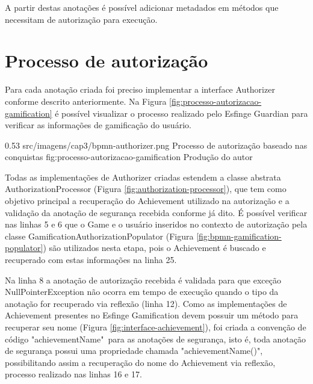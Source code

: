 \par A partir destas anotações é possível adicionar metadados em métodos que necessitam de autorização para execução.

\section{Processo de autorização}

\par Para cada anotação criada foi preciso implementar a interface Authorizer conforme descrito anteriormente. Na Figura \ref{fig:processo-autorizacao-gamification} é possível visualizar o processo realizado pelo Esfinge Guardian para verificar as informações de gamificação do usuário.

\begin{image}
{0.53}
{src/imagens/cap3/bpmn-authorizer.png}
{Processo de autorização baseado nas conquistas}
{fig:processo-autorizacao-gamification}
{Produção do autor}
\end{image}


\par Todas as implementações de Authorizer criadas estendem a classe abstrata AuthorizationProcessor (Figura \ref{fig:authorization-processor}), que tem como objetivo principal a recuperação do Achievement utilizado na autorização e a validação da anotação de segurança recebida conforme já dito. É possível verificar nas linhas 5 e 6 que o Game e o usuário inseridos no contexto de autorização pela classe GamificationAuthorizationPopulator (Figura \ref{fig:bpmn-gamification-populator}) são utilizados nesta etapa, pois o Achievement é buscado e recuperado com estas informações na linha 25.
\par Na linha 8 a anotação de autorização recebida é validada para que exceção NullPointerException não ocorra em tempo de execução quando o tipo da anotação for recuperado via reflexão (linha 12). Como as implementações de Achievement presentes no Esfinge Gamification devem possuir um método para recuperar seu nome (Figura \ref{fig:interface-achievement}), foi criada a convenção de código "achievementName"\ para as anotações de segurança, isto é, toda anotação de segurança possui uma propriedade chamada "achievementName()", possibilitando assim a recuperação do nome do Achievement via reflexão, processo realizado nas linhas 16 e 17.

